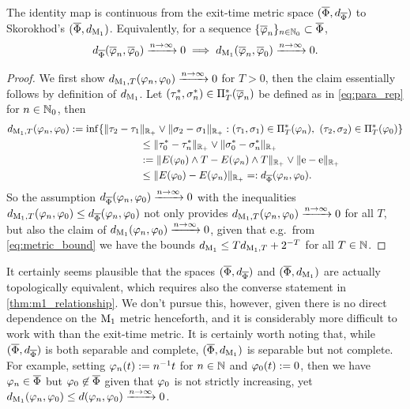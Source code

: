 \begin{theorem}\label{thm:m1_relationship}
    The identity map is continuous from the exit-time metric space $(\overline{\Phi},d_{\overline{\Phi}})$ to Skorokhod's $(\overline{\Phi},d_{\mathrm{M}_1})$. Equivalently, for a sequence $\{\overline{\varphi}_n\}_{n\in\mathbb{N}_0}\subset\overline{\Phi}$,
    \begin{equation}
        d_{\overline{\Phi}}(\overline{\varphi}_n,\overline{\varphi}_0)\xrightarrow{n\to\infty}0 \implies d_{\mathrm{M}_1}(\overline{\varphi}_n,\overline{\varphi}_0)\xrightarrow{n\to\infty}0.
    \end{equation}
\end{theorem}
\begin{proof}
    We first show $d_{\mathrm{M}_1,T}(\varphi_n,\varphi_0)\xrightarrow{n\to\infty}0$ for $T>0$, then the claim essentially follows by definition of $d_{\mathrm{M}_1}$. Let $(\tau^*_n,\sigma^*_n)\in\Pi^*_T(\overline{\varphi}_n)$ be defined as in \autoref{eq:para_rep} for $n\in\mathbb{N}_0$, then
    \begin{align}\label{eq:m1_limit}
        d_{\uM_1,T}(\vp_n,\vp_0) := \inf\{\Vert \tau_2 - \tau_1 & \Vert_{\RR_+}\vee\Vert \sigma_2 - \sigma_1 \Vert_{\RR_+} : (\tau_1,\sigma_1)\in\Pi^*_T(\vp_n),\ (\tau_2,\sigma_2)\in\Pi^*_T(\vp_0)\} \nonumber\\
        & \le\Vert \tau^*_0 - \tau^*_n \Vert_{\RR_+}\vee\Vert \sigma^*_0 - \sigma^*_n \Vert_{\RR_+} \nonumber\\
        &:= \Vert E(\vp_0)\wedge T - E(\vp_n)\wedge T \Vert_{\RR_+} \vee \Vert \id - \id \Vert_{\RR_+} \nonumber\\
        &\le \Vert E(\vp_0) - E(\vp_n) \Vert_{\RR_+} =: d_{\bPhi}(\vp_n,\vp_0).
    \end{align}
    So the assumption $d_{\overline{\Phi}}(\varphi_n,\varphi_0)\xrightarrow{n\to\infty}0$ with the inequalities $d_{\mathrm{M}_1,T}(\varphi_n,\varphi_0) \le d_{\overline{\Phi}}(\varphi_n,\varphi_0)$ not only provides $d_{\mathrm{M}_1,T}(\varphi_n,\varphi_0)\xrightarrow{n\to\infty}0$ for all $T$, but also the claim of $d_{\mathrm{M}_1}(\varphi_n,\varphi_0)\xrightarrow{n\to\infty}0$, given that e.g.~from \autoref{eq:metric_bound} we have the bounds $d_{\mathrm{M}_1}\le T d_{\mathrm{M}_1,T} + 2^{-T}$ for all $T\in\mathbb{N}$.
\end{proof}

It certainly seems plausible that the spaces $(\overline{\Phi},d_{\overline{\Phi}})$ and $(\overline{\Phi},d_{\mathrm{M}_1})$ are actually topologically equivalent, which requires also the converse statement in \autoref{thm:m1_relationship}. We don't pursue this, however, given there is no direct dependence on the $\mathrm{M}_1$ metric henceforth, and it is considerably more difficult to work with than the exit-time metric. It is certainly worth noting that, while $(\overline{\Phi},d_{\overline{\Phi}})$ is both separable and complete, $(\overline{\Phi},d_{\mathrm{M}_1})$ is separable but not complete. For example, setting $\varphi_n(t):=n^{-1}t$ for $n\in\mathbb{N}$ and $\varphi_0(t):=0$, then we have $\varphi_n\in\overline{\Phi}$ but $\varphi_0\not\in\overline{\Phi}$ given that $\varphi_0$ is not strictly increasing, yet $d_{\mathrm{M}_1}(\varphi_n,\varphi_0)\le d(\varphi_n,\varphi_0)\xrightarrow{n\to\infty}0$.

